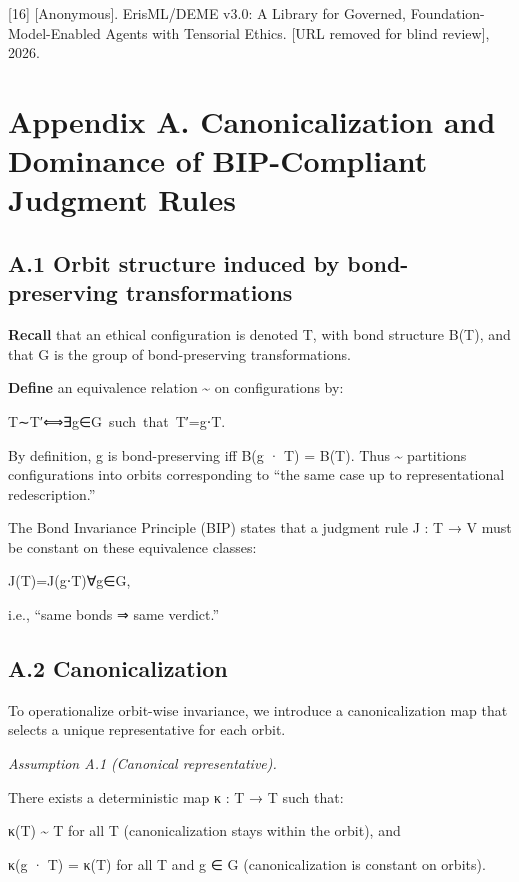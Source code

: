 \documentclass[12pt]{article}
\theoremstyle{plain}
\theoremstyle{definition}
\theoremstyle{remark}
\begin{document}
{[}16{]} [Anonymous]. ErisML/DEME v3.0: A Library for Governed,
Foundation-Model-Enabled Agents with Tensorial Ethics.
[URL removed for blind review], 2026.

\section{Appendix A. Canonicalization and Dominance of BIP-Compliant
Judgment
Rules}\label{appendix-a.-canonicalization-and-dominance-of-bip-compliant-judgment-rules}

\subsection{A.1 Orbit structure induced by bond-preserving
transformations}\label{a.1-orbit-structure-induced-by-bond-preserving-transformations}

\textbf{Recall} that an ethical configuration is denoted T, with bond
structure B(T), and that G is the group of bond-preserving
transformations.

\textbf{Define} an equivalence relation \textasciitilde{} on
configurations by:

T∼T′⟺∃g∈G~such~that~T′=g⋅T.

By definition, g is bond-preserving iff B(g · T) = B(T). Thus
\textasciitilde{} partitions configurations into orbits corresponding to
``the same case up to representational redescription.''

The Bond Invariance Principle (BIP) states that a judgment rule J : T →
V must be constant on these equivalence classes:

J(T)=J(g⋅T)∀g∈G,

i.e., ``same bonds ⇒ same verdict.''

\subsection{A.2 Canonicalization}\label{a.2-canonicalization}

To operationalize orbit-wise invariance, we introduce a canonicalization
map that selects a unique representative for each orbit.

\emph{Assumption A.1 (Canonical representative).}

There exists a deterministic map κ : T → T such that:

κ(T) \textasciitilde{} T for all T (canonicalization stays within the
orbit), and

κ(g · T) = κ(T) for all T and g ∈ G (canonicalization is constant on
orbits).
\end{document}
